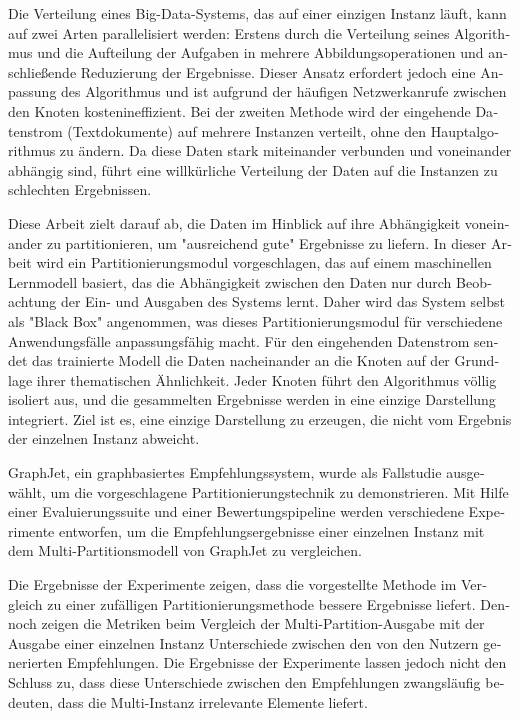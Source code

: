 \null\vfil
\begin{otherlanguage}{ngerman}
\begin{center}\textsf{\textbf{\abstractname}}\end{center}

\noindent
Die Verteilung eines Big-Data-Systems, das auf einer einzigen Instanz läuft, kann auf zwei Arten parallelisiert werden: Erstens durch die Verteilung seines Algorithmus und die Aufteilung der Aufgaben in mehrere Abbildungsoperationen und anschließende Reduzierung der Ergebnisse. Dieser Ansatz erfordert jedoch eine Anpassung des Algorithmus und ist aufgrund der häufigen Netzwerkanrufe zwischen den Knoten kostenineffizient. Bei der zweiten Methode wird der eingehende Datenstrom (Textdokumente) auf mehrere Instanzen verteilt, ohne den Hauptalgorithmus zu ändern. Da diese Daten stark miteinander verbunden und voneinander abhängig sind, führt eine willkürliche Verteilung der Daten auf die Instanzen zu schlechten Ergebnissen.

Diese Arbeit zielt darauf ab, die Daten im Hinblick auf ihre Abhängigkeit voneinander zu partitionieren, um "ausreichend gute" Ergebnisse zu liefern. In dieser Arbeit wird ein Partitionierungsmodul vorgeschlagen, das auf einem maschinellen Lernmodell basiert, das die Abhängigkeit zwischen den Daten nur durch Beobachtung der Ein- und Ausgaben des Systems lernt. Daher wird das System selbst als "Black Box" angenommen, was dieses Partitionierungsmodul für verschiedene Anwendungsfälle anpassungsfähig macht. Für den eingehenden Datenstrom sendet das trainierte Modell die Daten nacheinander an die Knoten auf der Grundlage ihrer thematischen Ähnlichkeit. Jeder Knoten führt den Algorithmus völlig isoliert aus, und die gesammelten Ergebnisse werden in eine einzige Darstellung integriert. Ziel ist es, eine einzige Darstellung zu erzeugen, die nicht vom Ergebnis der einzelnen Instanz abweicht.

GraphJet, ein graphbasiertes Empfehlungssystem, wurde als Fallstudie ausgewählt, um die vorgeschlagene Partitionierungstechnik zu demonstrieren. Mit Hilfe einer Evaluierungssuite und einer Bewertungspipeline werden verschiedene Experimente entworfen, um die Empfehlungsergebnisse einer einzelnen Instanz mit dem Multi-Partitionsmodell von GraphJet zu vergleichen.


Die Ergebnisse der Experimente zeigen, dass die vorgestellte Methode im Vergleich zu einer zufälligen Partitionierungsmethode bessere Ergebnisse liefert. Dennoch zeigen die Metriken beim Vergleich der Multi-Partition-Ausgabe mit der Ausgabe einer einzelnen Instanz Unterschiede zwischen den von den Nutzern generierten Empfehlungen. Die Ergebnisse der Experimente lassen jedoch nicht den Schluss zu, dass diese Unterschiede zwischen den Empfehlungen zwangsläufig bedeuten, dass die Multi-Instanz irrelevante Elemente liefert.

\end{otherlanguage}
\vfil\null



